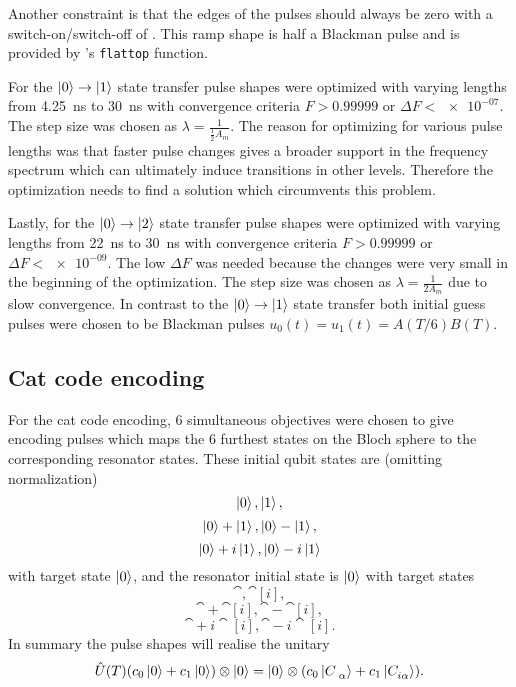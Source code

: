 \documentclass[main.tex]{subfiles}
\begin{document}
Another constraint is that the edges of the pulses should always be zero with a switch-on/switch-off of .
This ramp shape is half a Blackman pulse and is provided by \krotov{}'s \texttt{flattop} function.

For the \(\ket{0}\rightarrow\ket{1}\) state transfer pulse shapes were optimized with varying lengths from \SI{4.25}{\nano\second} to \SI{30}{\nano\second} with convergence criteria \(F>0.99999\) or \(\Delta F < \num{e-07}\).
The step size was chosen as \(\lambda = \frac{1}{\frac{1}{2}A_{m}}\).
The reason for optimizing for various pulse lengths was that faster pulse changes gives a broader support in the frequency spectrum which can ultimately induce transitions in other levels.
Therefore the optimization needs to find a solution which circumvents this problem.

Lastly, for the \(\ket{0}\rightarrow\ket{2}\) state transfer pulse shapes were optimized with varying lengths from \SI{22}{\nano\second} to \SI{30}{\nano\second} with convergence criteria \(F>0.99999\) or \(\Delta F < \num{e-09}\).
The low \(\Delta F\) was needed because the changes were very small in the beginning of the optimization.
The step size was chosen as \(\lambda = \frac{1}{2A_{m}}\) due to slow convergence.
In contrast to the \(\ket{0}\rightarrow\ket{1}\) state transfer both initial guess pulses were chosen to be Blackman pulses \(u_0(t) = u_1(t) = A(T/6)B(T)\).

\subsection{Cat code encoding}
For the cat code encoding, 6 simultaneous objectives were chosen to give encoding pulses which maps the 6 furthest states on the Bloch sphere to the corresponding resonator states.
These initial qubit states are (omitting normalization)
\[ \ket{0}, \ket{1},\]
\[ \ket{0}+\ket{1}, \ket{0}-\ket{1},\]
\[ \ket{0}+i\ket{1}, \ket{0}-i\ket{1} \]
with target state \(\ket{0}\),
and the resonator initial state is \(\ket{0}\) with target states
\[ \cat{}, \cat[i]{},\]
\[ \cat{}+\cat[i]{}, \cat{}-\cat[i]{},\]
\[ \cat{}+i\cat[i]{}, \cat{}-i\cat[i]{}. \]
In summary the pulse shapes will realise the unitary
\begin{equation}
    \hat{U}(T) \qty(c_0\ket{0}+c_1\ket{0})\otimes\ket{0} = \ket{0}\otimes\qty(c_0\cat{}+c_1\cat[i]{}).
\end{equation}
\end{document}
